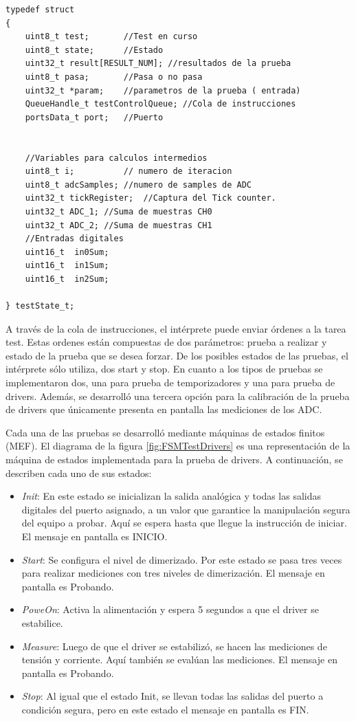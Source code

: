 \begin{lstlisting}[label=cod:estTestState, caption= Estructura de estado del test.]
typedef struct
{
	uint8_t test; 		//Test en curso
	uint8_t state; 		//Estado
	uint32_t result[RESULT_NUM]; //resultados de la prueba
	uint8_t pasa; 		//Pasa o no pasa
	uint32_t *param;	//parametros de la prueba ( entrada)
	QueueHandle_t testControlQueue; //Cola de instrucciones
	portsData_t port;	//Puerto


	//Variables para calculos intermedios
	uint8_t i;			// numero de iteracion
	uint8_t adcSamples; //numero de samples de ADC
	uint32_t tickRegister;	//Captura del Tick counter.
	uint32_t ADC_1; //Suma de muestras CH0
	uint32_t ADC_2; //Suma de muestras CH1
	//Entradas digitales
	uint16_t  in0Sum; 
	uint16_t  in1Sum;
	uint16_t  in2Sum;

} testState_t;
\end{lstlisting}

A través de la cola de instrucciones, el intérprete puede enviar órdenes a la tarea test. Estas ordenes están compuestas de dos parámetros: prueba a realizar y estado de la prueba que se desea forzar. De los posibles estados de las pruebas, el intérprete sólo utiliza, dos start y stop.
En cuanto a los tipos de pruebas se implementaron dos, una para prueba de temporizadores y una para prueba de drivers. Además, se desarrolló una tercera opción para la calibración de la prueba de drivers que únicamente presenta en pantalla las mediciones de los ADC.

Cada una de las pruebas se desarrolló mediante máquinas de estados finitos (MEF). 
El diagrama de la figura \ref{fig:FSMTestDrivers} es una representación de la máquina de estados implementada para la prueba de drivers. A continuación, se describen cada uno de sus estados:
\begin{itemize}
	\item \textit{Init}: En este estado se inicializan la salida analógica y todas las salidas digitales del puerto asignado, a un valor que garantice la manipulación segura del equipo  a probar. Aquí se espera hasta que llegue la instrucción de iniciar. El mensaje en pantalla es INICIO.
	\item \textit{Start}: Se configura el nivel de dimerizado. Por este estado se pasa tres veces para realizar mediciones con tres niveles de dimerización. El mensaje en pantalla es Probando.
	\item \textit{PoweOn}: Activa la alimentación y espera 5 segundos a que el driver se estabilice.
	\item \textit{Measure}: Luego de que el driver se estabilizó, se hacen las mediciones de tensión y corriente. Aquí también se evalúan las mediciones. El mensaje en pantalla es Probando.
	\item \textit{Stop}: Al igual que el estado Init, se llevan todas las salidas del puerto a condición segura, pero en este estado el mensaje en pantalla es FIN.
\end{itemize}
	
